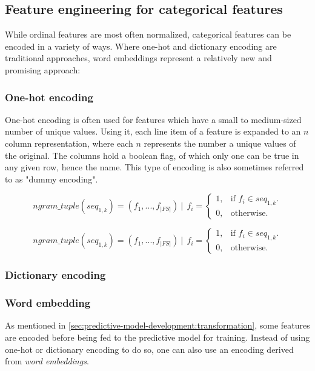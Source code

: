 \subsection{Feature engineering for categorical features}
While ordinal features are most often normalized, categorical features can be encoded in a variety of ways. Where one-hot and dictionary encoding are traditional approaches, word embeddings represent a relatively new and promising approach:

\subsubsection*{One-hot encoding}
One-hot encoding is often used for features which have a small to medium-sized number of unique values. Using it, each line item of a feature is expanded to an $n$ column representation, where each $n$ represents the number a unique values of the original. The columns hold a boolean flag, of which only one can be true in any given row, hence the name. This type of encoding is also sometimes referred to as "dummy encoding".


\begin{equation}\label{eq:ngram-tuple}
    ngram\_tuple(seq_{1,k}) = (f_1, ..., f_{|FS|})\ |\ \ f_i = 
    \begin{cases}
    1, & \text{if $f_i \in seq_{1,k}$}.\\
    0, & \text{otherwise}.
    \end{cases}
\end{equation}

\begin{equation}\label{eq:ngram-tuple}
    ngram\_tuple(seq_{1,k}) = (f_1, ..., f_{|FS|})\ |\ \ f_i = 
    \begin{cases}
    1, & \text{if $f_i \in seq_{1,k}$}.\\
    0, & \text{otherwise}.
    \end{cases}
\end{equation}

\subsubsection*{Dictionary encoding}
\subsubsection*{Word embedding}
As mentioned in \autoref{sec:predictive-model-development:transformation}, some features are encoded before being fed to the predictive model for training. Instead of using one-hot or dictionary encoding to do so, one can also use an encoding derived from \textit{word embeddings}.

